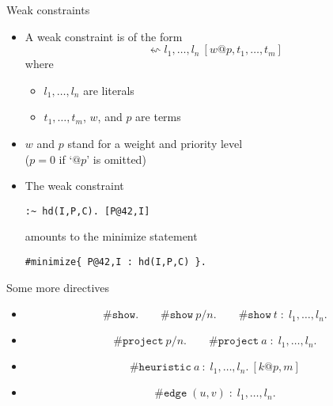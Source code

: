 \begin{frame}[fragile]{Weak constraints}
  \begin{itemize}
  \item {} A \alert{weak constraint} is of the form
    \[
    \leftsquigarrow  l_1,\dots, l_n\ [ w@p,t_1, \dots, t_m ]
    \]
    where
    \begin{itemize}\normalsize
    \item $l_1, \dots, l_n$ are literals
    \item $t_1, \dots, t_m$, $w$, and $p$ are terms
    \end{itemize}
  \item[] $w$ and $p$ stand for a weight and priority level
    \\
    ($p=0$ if `$@p$' is omitted)
    \smallskip
  \item<2-> 
    The weak constraint
\begin{lstlisting}
:~ hd(I,P,C). [P@42,I]
\end{lstlisting}
    \pause[3] amounts to the minimize statement
\begin{lstlisting}
#minimize{ P@42,I : hd(I,P,C) }.
\end{lstlisting}
  \end{itemize}
\end{frame}
\begin{frame}{Some more directives}
  \begin{itemize}
  \item<1-> 
    \[
      \#\mathtt{show}.\qquad \#\mathtt{show} \ p/n.\qquad \#\mathtt{show} \ t\; :\; l_1,\dots,l_n.
    \]
    \smallskip
  \item<2-> 
    \[
      \#\mathtt{project} \ p/n.\qquad \#\mathtt{project} \ a\; :\; l_1,\dots,l_n.
    \]
    \smallskip
  \item<3-> 
    \[
      \#\mathtt{heuristic} \ a\ :\; l_1,\dots,l_n. \ [k@p,m]
    \]
    \smallskip
  \item<4-> 
    \[
      \#\mathtt{edge}\; (u,v)\; :\; l_1,\dots,l_n.
    \]
  \end{itemize}
\end{frame}
%
